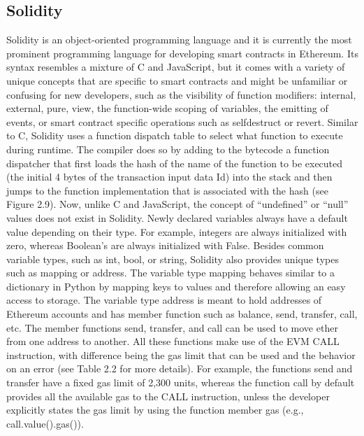     \subsection{Solidity}
        Solidity is an object-oriented programming language and it is currently the most prominent programming language for developing smart contracts in Ethereum. Its syntax resembles a mixture of C and JavaScript, but it comes with a variety of unique concepts that are specific to smart contracts and might be unfamiliar or confusing for new developers, such as the visibility of function modifiers: internal, external, pure, view, the function-wide scoping of variables, the emitting of events, or smart contract specific operations such as selfdestruct or revert. Similar to C, Solidity uses a function dispatch table to select what function to execute during runtime. The compiler does so by adding to the bytecode a function dispatcher that first loads the hash of the name of the function to be executed (the initial 4 bytes of the transaction input data Id) into the stack and then jumps to the function implementation that is associated with the hash (see Figure 2.9). Now, unlike C and JavaScript, the concept of “undefined” or “null” values does not exist in Solidity. Newly declared variables always
        have a default value depending on their type. For example, integers are always initialized with zero, whereas Boolean’s are always initialized with False. Besides common variable types, such as int, bool, or string, Solidity also provides unique types such as mapping or address. The variable type mapping behaves similar to a dictionary in Python by mapping keys to values and therefore allowing an easy access to storage. The variable type address is meant to hold addresses of Ethereum accounts and has member function such as balance, send, transfer, call, etc. The member functions send, transfer, and call can be used to move ether from one address to another. All these functions make use of the EVM CALL instruction, with difference being the gas limit that can be used and the behavior on an error (see Table 2.2 for more details). For example, the functions send and transfer have a fixed gas limit of 2,300 units, whereas the function call by default provides all the available gas to the CALL instruction, unless the developer explicitly states the gas limit by using the function member gas (e.g., call.value().gas()).


